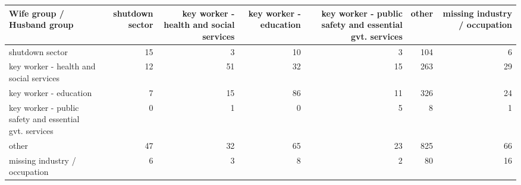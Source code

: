 
\begin{tabular}{lrrrrrr}
\toprule
Wife group / Husband group & shutdown sector & key worker - health
 and social services & key worker - education & key worker - public safety
 and essential gvt. services & other & missing industry / occupation\\
\midrule
shutdown sector & 15 & 3 & 10 & 3 & 104 & 6\\
key worker - health
 and social services & 12 & 51 & 32 & 15 & 263 & 29\\
key worker - education & 7 & 15 & 86 & 11 & 326 & 24\\
key worker - public safety
 and essential gvt. services & 0 & 1 & 0 & 5 & 8 & 1\\
other & 47 & 32 & 65 & 23 & 825 & 66\\
missing industry / occupation & 6 & 3 & 8 & 2 & 80 & 16\\
\bottomrule
\end{tabular}
